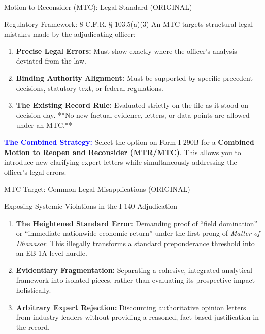 \documentclass[11pt]{beamer}
\begin{document}
	
	\begin{frame}{Motion to Reconsider (MTC): Legal Standard (ORIGINAL)}
		\scriptsize
		\begin{block}{Regulatory Framework: 8 C.F.R. § 103.5(a)(3)}
			An MTC targets structural legal mistakes made by the adjudicating officer:
			\begin{enumerate}
				\item \textbf{Precise Legal Errors:} Must show exactly where the officer's analysis deviated from the law.
				\item \textbf{Binding Authority Alignment:} Must be supported by specific precedent decisions, statutory text, or federal regulations.
				\item \textbf{The Existing Record Rule:} Evaluated strictly on the file as it stood on decision day. **No new factual evidence, letters, or data points are allowed under an MTC.**
			\end{enumerate}
			\vspace{0.15cm}
			\textcolor{blue}{\textbf{The Combined Strategy:}} Select the option on Form I-290B for a \textbf{Combined Motion to Reopen and Reconsider (MTR/MTC)}. This allows you to introduce new clarifying expert letters while simultaneously addressing the officer's legal errors.
		\end{block}
	\end{frame}
	
	\begin{frame}{MTC Target: Common Legal Misapplications (ORIGINAL)}
		\scriptsize
		\begin{block}{Exposing Systemic Violations in the I-140 Adjudication}
			\begin{enumerate}
				\item \textbf{The Heightened Standard Error:} Demanding proof of ``field domination'' or ``immediate nationwide economic return'' under the first prong of \textit{Matter of Dhanasar}. This illegally transforms a standard preponderance threshold into an EB-1A level hurdle.
				\item \textbf{Evidentiary Fragmentation:} Separating a cohesive, integrated analytical framework into isolated pieces, rather than evaluating its prospective impact holistically.
				\item \textbf{Arbitrary Expert Rejection:} Discounting authoritative opinion letters from industry leaders without providing a reasoned, fact-based justification in the record.
			\end{enumerate}
		\end{block}
	\end{frame}
	
\end{document}
